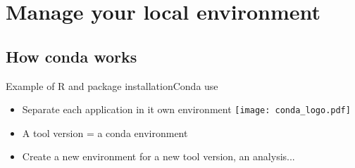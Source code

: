 \section{Manage your local environment}
\subsection{How conda works}
\begin{frame}[<+->]{Example of R and package installation}{Conda use}
\begin{itemize}
	\item Separate each application in it own environment \texttt{[image: conda\_logo.pdf]}
	\item A tool version = a conda environment
	\item Create a new environment for a new tool version, an analysis...
\end{itemize}
\end{frame}
